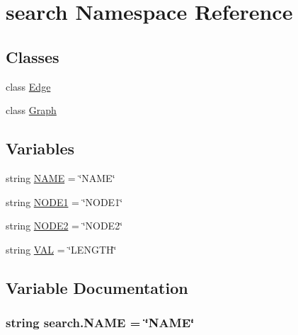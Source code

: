 \hypertarget{namespacesearch}{}\section{search Namespace Reference}
\label{namespacesearch}
\subsection*{Classes}
\begin{DoxyCompactItemize}
\item 
class \hyperlink{classsearch_1_1_edge}{Edge}
\item 
class \hyperlink{classsearch_1_1_graph}{Graph}
\end{DoxyCompactItemize}
\subsection*{Variables}
\begin{DoxyCompactItemize}
\item 
string \hyperlink{namespacesearch_a682b65ec2dc4b81df3cc46825756194c}{N\+A\+M\+E} = \char`\"{}N\+A\+M\+E\char`\"{}
\item 
string \hyperlink{namespacesearch_a1bf1ab8437b32f4116bdc944122a454a}{N\+O\+D\+E1} = \char`\"{}N\+O\+D\+E1\char`\"{}
\item 
string \hyperlink{namespacesearch_a6d7debe26d5c70d1cd1e805ee6d9343e}{N\+O\+D\+E2} = \char`\"{}N\+O\+D\+E2\char`\"{}
\item 
string \hyperlink{namespacesearch_a2314deae373504bfc40d9146762e4be5}{V\+A\+L} = \char`\"{}L\+E\+N\+G\+T\+H\char`\"{}
\end{DoxyCompactItemize}


\subsection{Variable Documentation}
\hypertarget{namespacesearch_a682b65ec2dc4b81df3cc46825756194c}{}
\subsubsection[{N\+A\+M\+E}]{\setlength{\rightskip}{0pt plus 5cm}string search.\+N\+A\+M\+E = \char`\"{}N\+A\+M\+E\char`\"{}}\label{namespacesearch_a682b65ec2dc4b81df3cc46825756194c}
\hypertarget{namespacesearch_a1bf1ab8437b32f4116bdc944122a454a}{}
